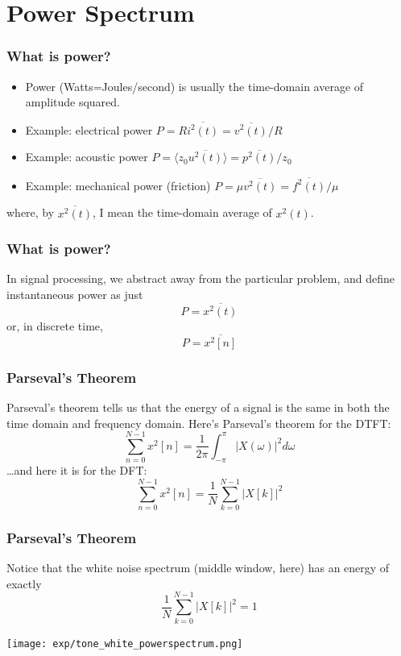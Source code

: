 \documentclass{beamer}
\begin{document}
\section[Power]{Power Spectrum}
\setcounter{subsection}{1}

\begin{frame}
  \frametitle{What is power?}

  \begin{itemize}
    \item Power (Watts=Joules/second) is usually the time-domain
      average of amplitude squared.
    \item Example: electrical power $P=R\overline{i^2(t)} = \overline{v^2(t)}/R$
    \item Example: acoustic power $P=\langle z_0 \overline{u^2(t)}\rangle = \overline{p^2(t)}/z_0$
    \item Example: mechanical power (friction) $P= \mu\overline{v^2(t)} = \overline{f^2(t)}/\mu$
  \end{itemize}
  where, by $\overline{x^2(t)}$, I mean the time-domain average of $x^2(t)$.
\end{frame}

\begin{frame}
  \frametitle{What is power?}

  In signal processing, we abstract away from the particular problem,
  and define instantaneous power as just
  \[
  P = \overline{x^2(t)}
  \]
  or, in  discrete time,
  \[
  P = \overline{x^2[n]}
  \]
\end{frame}
  
\begin{frame}
  \frametitle{Parseval's Theorem} Parseval's theorem tells us that the
  energy of a signal is the same in both the time domain and frequency
  domain.  Here's Parseval's theorem for the DTFT:
  \[
  \sum_{n=0}^{N-1}x^2[n] = \frac{1}{2\pi}\int_{-\pi}^{\pi}\left|X(\omega)\right|^2d\omega
  \]
  \ldots and here it is for the DFT:
  \[
  \sum_{n=0}^{N-1}x^2[n] = \frac{1}{N}\sum_{k=0}^{N-1}\left|X[k]\right|^2
  \]  
\end{frame}

\begin{frame}
  \frametitle{Parseval's Theorem}

  Notice that the white noise spectrum (middle window, here) has an energy of exactly
  \[
  \frac{1}{N}\sum_{k=0}^{N-1}\left|X[k]\right|^2 = 1
  \]
  
  \centerline{\texttt{[image: exp/tone\_white\_powerspectrum.png]}}
\end{frame}
\end{document}
